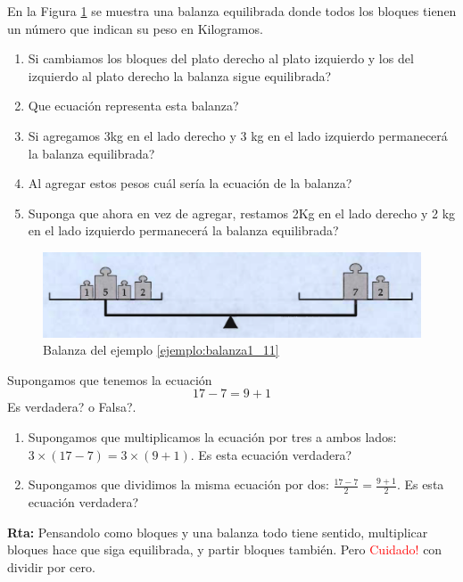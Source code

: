\begin{ejemplo} \label{ejemplo:balanza1_11}
	En la Figura \ref{fig_balanza1_11} se muestra una balanza equilibrada donde todos los bloques tienen un número que indican su peso en Kilogramos. 
	\begin{enumerate}[label=\Alph*)]
		\item Si cambiamos los bloques del plato derecho al plato izquierdo y los del izquierdo al plato derecho la balanza sigue equilibrada?
		
		\item Que ecuación representa esta balanza?
		
		\item Si agregamos 3kg en el lado derecho y 3 kg en el lado izquierdo permanecerá la balanza equilibrada?
		
		\item Al agregar estos pesos cuál sería la ecuación de la balanza?
		
		\item Suponga que ahora en vez de agregar, restamos 2Kg en el lado derecho y 2 kg en el lado izquierdo permanecerá la balanza equilibrada?
	\end{enumerate}

	\begin{figure}[H]
		\centering
		\includegraphics[width=0.8\linewidth]{Algebra/imgs/balanza1_11.png}
		\caption{Balanza del ejemplo \ref{ejemplo:balanza1_11}}
		\label{fig_balanza1_11}
	\end{figure}
\end{ejemplo}

\begin{ejemplo} 
	Supongamos que tenemos la ecuación
	\[
	17-7=9+1
	\]
	Es verdadera? o Falsa?. 
	\begin{enumerate}[label=\Alph*)]
		\item Supongamos que multiplicamos la ecuación por tres a ambos lados: $3\times (17-7)=3\times (9+1)$. Es esta ecuación verdadera?
		
		\item Supongamos que dividimos la misma ecuación por dos: $\frac{17-7}{2} = \frac{9+1}{2}$. Es esta ecuación verdadera?
	\end{enumerate}
	\textbf{Rta: } Pensandolo como bloques y una balanza todo tiene sentido, multiplicar bloques hace que siga equilibrada, y partir bloques también. Pero \textcolor{red}{Cuidado!} con dividir por cero.
\end{ejemplo}

